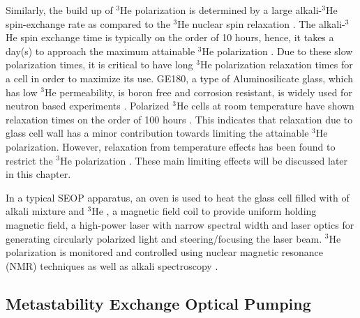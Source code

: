 Similarly, the build up of $^3$He polarization is determined by a large alkali-$^3$He spin-exchange rate as compared to the $^3$He nuclear spin relaxation \cite{Gentile2017}. The alkali-$^3$He spin exchange time is typically on the order of 10 hours, hence, it takes a day(s) to approach the maximum attainable $^3$He polarization \cite{Chen2011, Gentile2017}. Due to these slow polarization times, it is critical to have long $^3$He polarization relaxation times for a cell in order to maximize its use. GE180, a type of Aluminosilicate glass, which has low $^3$He permeability, is boron free and corrosion resistant, is widely used for neutron based experiments \cite{Newbury1993, Chen2014, Heil1995}. Polarized $^3$He cells at room temperature have shown relaxation times on the order of 100 hours  \cite{Chen2011}. This indicates that relaxation due to glass cell wall has a minor contribution towards limiting the attainable $^3$He polarization. However, relaxation from temperature effects has been found to restrict the $^3$He polarization \cite{Babcock2006}. These main limiting effects will be discussed later in this chapter.

In a typical SEOP apparatus, an oven is used to heat the glass cell filled with of alkali mixture and $^3$He \cite{Tong2010, Babcock2016}, a magnetic field coil to provide uniform holding magnetic field, a high-power laser with narrow spectral width \cite{Babcock2005, Chen2014, Liu2015} and laser optics for generating circularly polarized light and steering/focusing the laser beam. $^3$He polarization is monitored and controlled using nuclear magnetic resonance (NMR) techniques as well as alkali spectroscopy \cite{Romalis1998}.


\subsection{Metastability Exchange Optical Pumping}

